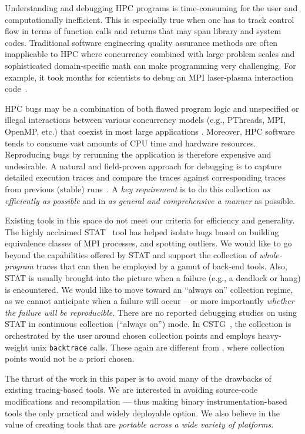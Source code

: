 Understanding and debugging HPC programs 
is time-consuming for the user and computationally inefficient.
%
This is especially true when one has to 
track control flow in terms of function calls and returns that may
span library and system codes. 
%
Traditional software engineering quality assurance methods are 
often inapplicable to HPC where concurrency combined with 
large problem scales and sophisticated domain-specific math can make programming 
very challenging. 
%
For example, it took months for scientists to debug an MPI laser-plasma interaction 
code~\cite{hpcdoe}.


HPC bugs may be a combination of both flawed program logic and unspecified or illegal interactions between various concurrency models (e.g., PThreads, MPI, OpenMP, etc.) that coexist in most large applications \cite{hpcdoe}. Moreover, HPC software tends to consume vast amounts of CPU time and hardware resources. Reproducing bugs by rerunning the application is therefore expensive and undesirable. 
A natural and field-proven approach for debugging is to capture detailed execution traces and compare the traces against corresponding traces from previous (stable) runs~\cite{stat,cstg}.
%
A {\em key requirement} is to do this collection {\em as efficiently as possible}
and in {\em as general and comprehensive a manner} as possible.


Existing tools in this space
do not meet our criteria for efficiency and generality.
%
The highly acclaimed STAT~\cite{stat} tool has helped isolate
bugs based on building equivalence classes of MPI processes, and spotting
outliers.
%
We would like to go beyond the capabilities offered by STAT and support
the collection of {\em whole-program} traces that can then be employed
by a  gamut of back-end tools.
%
Also, STAT is usually brought into the picture
when a failure (e.g., a deadlock or hang) is encountered. We would like
to move toward an ``always on'' collection regime, as we cannot anticipate
when a failure will occur -- or more importantly {\em whether the failure
will be reproducible.}
%
There are no reported debugging studies on using STAT in
continuous collection (``always on'') mode.
%
In CSTG~\cite{cstg}, the collection is orchestrated by the
user around chosen collection points and employs heavy-weight
unix {\tt backtrace} calls.
%
These again are different from \parlot, where collection points would not be a priori chosen.


The thrust of the work in this paper is to avoid many of the drawbacks of existing
tracing-based tools.
%
We are interested in avoiding
source-code modifications and recompilation --- thus making binary
instrumentation-based tools the only practical and widely deployable option.
%
We also believe in the value
of creating tools that are {\em portable across a 
wide variety of platforms}.
%

